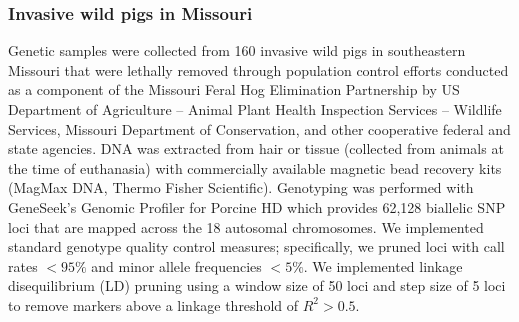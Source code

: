 {\subsubsection*{Invasive wild pigs in Missouri}

Genetic samples were collected from 160 invasive wild pigs in southeastern
Missouri that were lethally removed through population control efforts
conducted as a component of the Missouri Feral Hog Elimination Partnership
by US Department of Agriculture – Animal Plant Health Inspection Services –
Wildlife Services, Missouri Department of Conservation, and other cooperative
federal and state agencies.
DNA was extracted from hair or tissue (collected from animals at the time of euthanasia) with
commercially available magnetic bead recovery kits (MagMax DNA, Thermo Fisher Scientific).
Genotyping was performed with GeneSeek’s Genomic Profiler for Porcine HD which provides
62,128 biallelic SNP loci that are mapped across the 18 autosomal chromosomes.
We implemented standard genotype quality control measures; specifically, we pruned loci with
call rates $<95\%$ and minor allele frequencies $<5\%$.
We implemented linkage disequilibrium (LD) pruning using a window size of 50 loci and step size
of 5 loci to remove markers above a linkage threshold of $R^2 > 0.5$.

}

